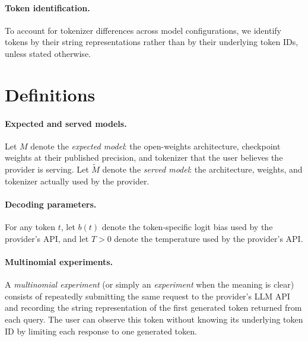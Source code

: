 \documentclass{article}
\begin{document}
\paragraph{Token identification.}
To account for tokenizer differences across model configurations, we identify
tokens by their string representations rather than by their underlying token
IDs, unless stated otherwise.

\section{Definitions}

\paragraph{Expected and served models.}
Let $M$ denote the \emph{expected model}: the open-weights architecture,
checkpoint weights at their published precision, and tokenizer that the user
believes the provider is serving. Let $\widetilde{M}$ denote the \emph{served
model}: the architecture, weights, and tokenizer actually used by the provider.

\paragraph{Decoding parameters.}
For any token $t$, let $b(t)$ denote the token-specific logit bias used by the
provider's API, and let $T>0$ denote the temperature used by the provider's API.

\paragraph{Multinomial experiments.}
A \emph{multinomial experiment} (or simply an \emph{experiment} when the
meaning is clear) consists of repeatedly submitting the same request to the
provider's LLM API and recording the string representation of the first
generated token returned from each query. The user can observe this token without
knowing its underlying token ID by limiting each response to one generated
token.
\end{document}
